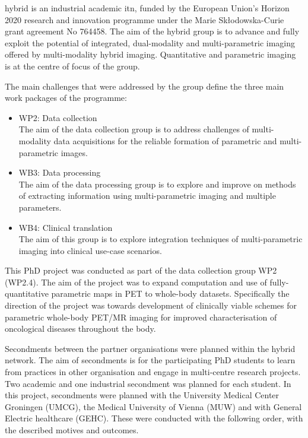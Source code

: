 \Gls{hybrid} is an industrial academic \gls{itn}, funded by the European Union's Horizon 2020 research and innovation programme under the Marie Sk\l{}odowska-Curie grant agreement No 764458.
The aim of the \gls{hybrid} group is to advance and fully exploit the potential of integrated, dual-modality and multi-parametric imaging offered by multi-modality hybrid imaging. Quantitative and parametric imaging is at the centre of focus of the group. 

The main challenges that were addressed by the group define the three main work packages of the programme:
\begin{itemize}
    \item WP2: Data collection \\
    The aim of the data collection group is to address challenges of multi-modality data acquisitions for the reliable formation of parametric and multi-parametric images. 
    \item WB3: Data processing \\
    The aim of the data processing group is to explore and improve on methods of extracting information using multi-parametric imaging and multiple parameters. 
    \item WB4: Clinical translation \\
    The aim of this group is to explore integration techniques of multi-parametric imaging into clinical use-case scenarios. 
\end{itemize}

This PhD project was conducted as part of the data collection group WP2 (WP2.4). The aim of the project was to expand computation and use of fully-quantitative parametric maps in PET to whole-body datasets. Specifically the direction of the project was towards development of clinically viable schemes for parametric whole-body PET/MR imaging for improved characterisation of oncological diseases throughout the body. 

Secondments between the partner organisations were planned within the \gls{hybrid} network. The aim of secondments is for the participating PhD students to learn from practices in other organisation and engage in multi-centre research projects. Two academic and one industrial secondment was planned for each student. 
In this project, secondments were planned with the University Medical Center Groningen (UMCG), the Medical University of Vienna (MUW) and with General Electric healthcare (GEHC). These were conducted with the following order, with the described motives and outcomes.

